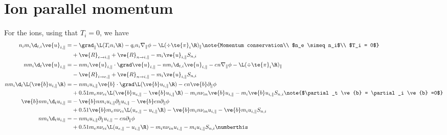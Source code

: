 \section{Ion parallel momentum}
For the ions, using that $T_i = 0$, we have
%
\begin{align*}
 n_im_i\d_{t,i} \ve{u}_{i,\|}
 =&
 - \grad_\| \L(T_i n_i\R)
 - q_in_i\nabla_\|\phi
 - \L(\div\te{\pi}_i\R)_\|
 \note{Momentum conservation\\
       $n_e \simeq n_i$\\
       $T_i = 0$}
 \\
 &
 + \ve{R}_{e\to i,\|}
 + \ve{R}_{n\to i,\|}
 - m_i \ve{u}_{i,\|}S_{n,i}
 \\
%
%
nm_i\d_{t} \ve{u}_{i,\|}
 =&
 - nm_i \ve{u}_{i,\|} \cdot \grad \ve{u}_{i,\|}
 - nm_i\d_{t,i} \ve{u}_{i,\|}
 - en\nabla_\|\phi
 - \L(\div\te{\pi}_i\R)_\|
 \\
 &
 - \ve{R}_{i\to e,\|}
 + \ve{R}_{n\to i,\|}
 - m_i \ve{u}_{i,\|}S_{n,i}
 \\
%
%
nm_i\d_{t} \L(\ve{b}u_{i,\|}\R)
 =&
 - nm_i u_{i,\|} \ve{b}\cdot \grad\L( \ve{b}u_{i,\|}\R)
 - en\ve{b}\partial_\|\phi
 \\
 &
 + 0.51m_en \nu_{ei}\L(\ve{b}u_{e,\|}-\ve{b}u_{i,\|}\R)
 - m_in \nu_{in}\ve{b}u_{i,\|}
 - m_i \ve{b}u_{i,\|}S_{n,i}
  \note{$\partial_t \ve{b} = \partial_i \ve{b} =0$}
 \\
%
%
\ve{b}nm_i\d_{t} u_{i,\|}
 =&
 - \ve{b}nm_i u_{i,\|} \partial_\| u_{i,\|}
 - \ve{b}en\partial_\|\phi
 \\
 &
 + 0.51 \ve{b} m_en \nu_{ei}\L(u_{e,\|}-u_{i,\|}\R)
 - \ve{b}m_in \nu_{in}u_{i,\|}
 - \ve{b}m_i u_{i,\|}S_{n,i}
 \\
%
%
nm_i\d_{t} u_{i,\|}
 =&
 - nm_i u_{i,\|} \partial_\| u_{i,\|}
 - en\partial_\|\phi
 \\
 &
 + 0.51 m_en \nu_{ei}\L(u_{e,\|}-u_{i,\|}\R)
 - m_in \nu_{in}u_{i,\|}
 - m_i u_{i,\|}S_{n,i}
  \numberthis
  \label{eq:non_norm_i_mom}
\end{align*}
%

